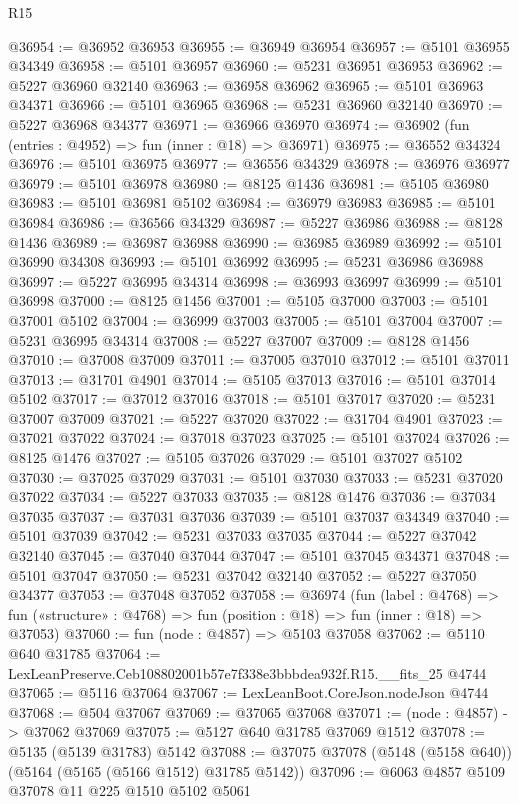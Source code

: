 \begin{lexlean}{R15}
\begin{coremodule}
{{{{{{{{{{{@36954 := @36952 @36953
@36955 := @36949 @36954
@36957 := @5101 @36955 @34349
@36958 := @5101 @36957
@36960 := @5231 @36951 @36953
@36962 := @5227 @36960 @32140
@36963 := @36958 @36962
@36965 := @5101 @36963 @34371
@36966 := @5101 @36965
@36968 := @5231 @36960 @32140
@36970 := @5227 @36968 @34377
@36971 := @36966 @36970
@36974 := @36902 (fun (entries : @4952) => fun (inner : @18) => @36971)
@36975 := @36552 @34324
@36976 := @5101 @36975
@36977 := @36556 @34329
@36978 := @36976 @36977
@36979 := @5101 @36978
@36980 := @8125 @1436
@36981 := @5105 @36980
@36983 := @5101 @36981 @5102
@36984 := @36979 @36983
@36985 := @5101 @36984
@36986 := @36566 @34329
@36987 := @5227 @36986
@36988 := @8128 @1436
@36989 := @36987 @36988
@36990 := @36985 @36989
@36992 := @5101 @36990 @34308
@36993 := @5101 @36992
@36995 := @5231 @36986 @36988
@36997 := @5227 @36995 @34314
@36998 := @36993 @36997
@36999 := @5101 @36998
@37000 := @8125 @1456
@37001 := @5105 @37000
@37003 := @5101 @37001 @5102
@37004 := @36999 @37003
@37005 := @5101 @37004
@37007 := @5231 @36995 @34314
@37008 := @5227 @37007
@37009 := @8128 @1456
@37010 := @37008 @37009
@37011 := @37005 @37010
@37012 := @5101 @37011
@37013 := @31701 @4901
@37014 := @5105 @37013
@37016 := @5101 @37014 @5102
@37017 := @37012 @37016
@37018 := @5101 @37017
@37020 := @5231 @37007 @37009
@37021 := @5227 @37020
@37022 := @31704 @4901
@37023 := @37021 @37022
@37024 := @37018 @37023
@37025 := @5101 @37024
@37026 := @8125 @1476
@37027 := @5105 @37026
@37029 := @5101 @37027 @5102
@37030 := @37025 @37029
@37031 := @5101 @37030
@37033 := @5231 @37020 @37022
@37034 := @5227 @37033
@37035 := @8128 @1476
@37036 := @37034 @37035
@37037 := @37031 @37036
@37039 := @5101 @37037 @34349
@37040 := @5101 @37039
@37042 := @5231 @37033 @37035
@37044 := @5227 @37042 @32140
@37045 := @37040 @37044
@37047 := @5101 @37045 @34371
@37048 := @5101 @37047
@37050 := @5231 @37042 @32140
@37052 := @5227 @37050 @34377
@37053 := @37048 @37052
@37058 := @36974
    (fun (label : @4768) =>
    fun («structure» : @4768) => fun (position : @18) => fun (inner : @18) => @37053)
@37060 := fun (node : @4857) => @5103 @37058
@37062 := @5110 @640 @31785
@37064 := LexLeanPreserve.Ceb108802001b57e7f338e3bbbdea932f.R15.__fits_25 @4744
@37065 := @5116 @37064
@37067 := LexLeanBoot.CoreJson.nodeJson @4744
@37068 := @504 @37067
@37069 := @37065 @37068
@37071 := (node : @4857) -> @37062 @37069
@37075 := @5127 @640 @31785 @37069 @1512
@37078 := @5135 (@5139 @31783) @5142
@37088 := @37075 @37078 (@5148 (@5158 @640)) (@5164 (@5165 (@5166 @1512) @31785 @5142))
@37096 := @6063 @4857 @5109 @37078 @11 @225 @1510 @5102 @5061
}}}}}}}}}}}
\end{coremodule}
\end{lexlean}
